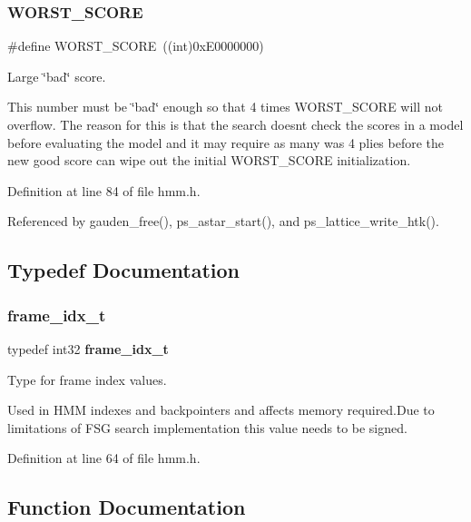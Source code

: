 \subsubsection{W\+O\+R\+S\+T\+\_\+\+S\+C\+O\+RE}
{\footnotesize\ttfamily \#define W\+O\+R\+S\+T\+\_\+\+S\+C\+O\+RE~((int)0x\+E0000000)}



Large \char`\"{}bad\char`\"{} score. 

This number must be \char`\"{}bad\char`\"{} enough so that 4 times W\+O\+R\+S\+T\+\_\+\+S\+C\+O\+RE will not overflow. The reason for this is that the search doesn\textquotesingle{}t check the scores in a model before evaluating the model and it may require as many was 4 plies before the new \textquotesingle{}good\textquotesingle{} score can wipe out the initial W\+O\+R\+S\+T\+\_\+\+S\+C\+O\+RE initialization. 

Definition at line 84 of file hmm.\+h.



Referenced by gauden\+\_\+free(), ps\+\_\+astar\+\_\+start(), and ps\+\_\+lattice\+\_\+write\+\_\+htk().



\subsection{Typedef Documentation}
\mbox{\label{hmm_8h_ac9c9bae34d05f32736ae1743316737ef}} 
\subsubsection{frame\+\_\+idx\+\_\+t}
{\footnotesize\ttfamily typedef int32 \textbf{ frame\+\_\+idx\+\_\+t}}



Type for frame index values. 

Used in H\+MM indexes and backpointers and affects memory required.\+Due to limitations of F\+SG search implementation this value needs to be signed. 

Definition at line 64 of file hmm.\+h.



\subsection{Function Documentation}
\mbox{\label{hmm_8h_af4c0cefb23087a0b1731b34048cfdaf9}} 
